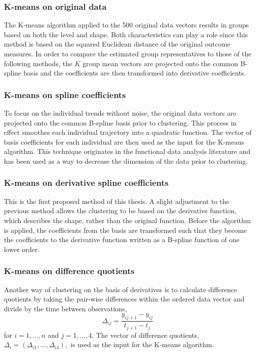 \subsubsection{K-means on original data}
The K-means algorithm applied to the 500 original data vectors results in groups based on both the level and shape. Both characteristics can play a role since this method is based on the squared Euclidean distance of the original outcome measures. In order to compare the estimated group representatives to those of the following methods, the $K$ group mean vectors are projected onto the common B-spline basis and the coefficients are then transformed into derivative coefficients.  

\subsubsection{K-means on spline coefficients}
To focus on the individual trends without noise, the original data vectors are projected onto the common B-spline basis prior to clustering. This process in effect smoothes each individual trajectory into a quadratic function. The vector of basis coefficients for each individual are then used as the input for the K-means algorithm. This technique originates in the functional data analysis literature \cite{ramsay2005} and has been used as a way to decrease the dimension of the data prior to clustering. 

\subsubsection{K-means on derivative spline coefficients}
This is the first proposed method of this thesis. A slight adjustment to the previous method allows the clustering to be based on the derivative function, which describes the shape, rather than the original function. Before the algorithm is applied, the coefficients from the basis are transformed such that they become the coefficients to the derivative function written as a B-spline function of one lower order. 

\subsubsection{K-means on difference quotients}
Another way of clustering on the basis of derivatives is to calculate difference quotients by taking the pair-wise differences within the ordered data vector and divide by the time between observations,
$$\Delta_{ij} = \frac{y_{ij+1}-y_{ij}}{t_{j+1}-t_{j}}$$
for $i=1,...,n$ and $j=1,...,4$. The vector of difference quotients, $\Delta_{i}=(\Delta_{i1},...,\Delta_{i4}),$ is used as the input for the K-means algorithm.

